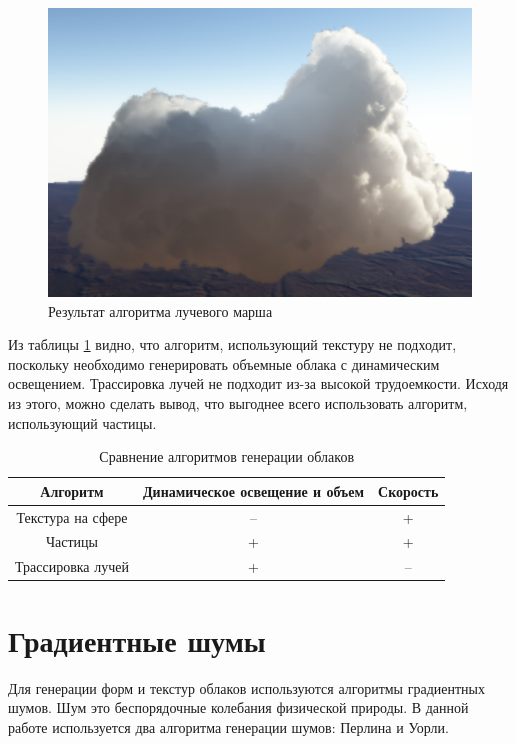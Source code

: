 \begin{figure}[H]
    \centering
    \includegraphics[scale=0.4]{img/raymach.png}
    \caption{Результат алгоритма лучевого марша}
    \label{img:raymach}
\end{figure}

Из таблицы \ref{table:clouds} видно, что алгоритм, использующий текстуру не подходит, поскольку необходимо генерировать
объемные облака с динамическим освещением. Трассировка лучей не подходит из-за высокой трудоемкости. Исходя из этого,
можно сделать вывод, что выгоднее всего использовать алгоритм, использующий частицы.

\begin{table}[H]
    \centering
    \caption{Сравнение алгоритмов генерации облаков}
    \label{table:clouds}
    \begin{tabular}{|c||c|c|}
        \hline
        Алгоритм & Динамическое освещение и объем & Скорость \\
        \hline
        \hline
        Текстура на сфере & -- & + \\
        \hline
        Частицы & + & + \\
        \hline
        Трассировка лучей & + & -- \\
        \hline
    \end{tabular}
\end{table}

\section{Градиентные шумы}

Для генерации форм и текстур облаков используются алгоритмы градиентных шумов.
Шум это беспорядочные колебания физической природы. В данной работе используется два алгоритма
генерации шумов: Перлина и Уорли.

